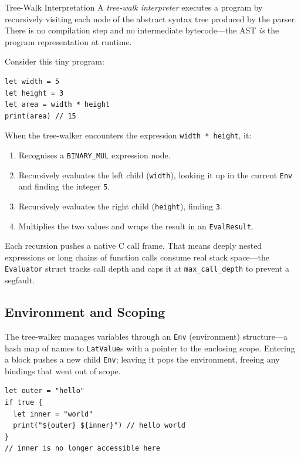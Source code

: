 \begin{defnbox}{Tree-Walk Interpretation}
A \emph{tree-walk interpreter} executes a program by recursively visiting each
node of the abstract syntax tree produced by the parser. There is no
compilation step and no intermediate bytecode---the AST \emph{is} the program
representation at runtime.
\end{defnbox}

Consider this tiny program:

\begin{lstlisting}[language=Lattice, caption={A value flowing through the tree-walker}]
let width = 5
let height = 3
let area = width * height
print(area) // 15
\end{lstlisting}

When the tree-walker encounters the expression \lstinline|width * height|, it:

\begin{enumerate}
  \item Recognises a \texttt{BINARY\_MUL} expression node.
  \item Recursively evaluates the left child (\lstinline|width|), looking it up
        in the current \lstinline|Env| and finding the integer \texttt{5}.
  \item Recursively evaluates the right child (\lstinline|height|), finding
        \texttt{3}.
  \item Multiplies the two values and wraps the result in an
        \lstinline|EvalResult|.
\end{enumerate}

\noindent
Each recursion pushes a native C call frame. That means deeply nested
expressions or long chains of function calls consume real stack space---the
\lstinline|Evaluator| struct tracks call depth and caps it at
\lstinline|max_call_depth| to prevent a segfault.

\subsection{Environment and Scoping}

The tree-walker manages variables through an \lstinline|Env| (environment)
structure---a hash map of names to \lstinline|LatValue|s with a pointer to the
enclosing scope. Entering a block pushes a new child \lstinline|Env|; leaving
it pops the environment, freeing any bindings that went out of scope.

\begin{lstlisting}[language=Lattice, caption={Scoping in the tree-walker}]
let outer = "hello"
if true {
  let inner = "world"
  print("${outer} ${inner}") // hello world
}
// inner is no longer accessible here
\end{lstlisting}

